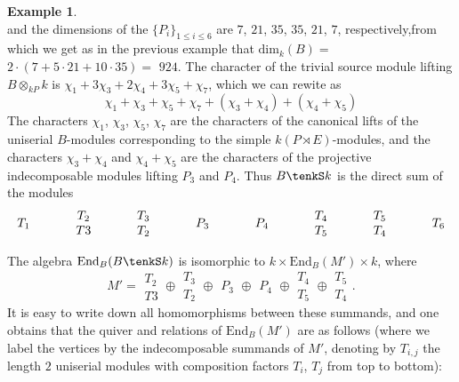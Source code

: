 \documentclass{amsart}
\theoremstyle{plain}\newtheorem{Theorem}{Theorem}[section]
\theoremstyle{plain}\newtheorem{Conjecture}[Theorem]{Conjecture}
\theoremstyle{plain}\newtheorem{Corollary}[Theorem]{Corollary}
\theoremstyle{plain}\newtheorem{Lemma}[Theorem]{Lemma}
\theoremstyle{plain}\newtheorem{Proposition}[Theorem]{Proposition}
\theoremstyle{definition}\newtheorem{Definition}[Theorem]{Definition}
\theoremstyle{definition}\newtheorem{Example}[Theorem]{Example}
\theoremstyle{definition}\newtheorem{Examples}[Theorem]{Examples}
\theoremstyle{definition}\newtheorem{Exercise}[Theorem]{Exercise}
\theoremstyle{definition}\newtheorem{Notation}[Theorem]{Notation}
\theoremstyle{definition}\newtheorem{Remark}[Theorem]{Remark}
\theoremstyle{definition}\newtheorem{Remarks}[Theorem]{Remarks}
\theoremstyle{plain}\newtheorem{Statement}[Theorem]{}
\def\dim{\mathrm{dim}}   \def\tenkP{\otimes_{kP}} \def\tenkQ{\otimes_{kQ}}
\def\End{\mathrm{End}}
\begin{document}
\begin{Example}
$$$$
and the dimensions of the $\{P_i\}_{1\leq i\leq 6}$ are $7$, $21$, $35$, $35$, $21$, $7$,
respectively,from which we get as in the previous example  that 
$\dim_k(B)=$ $2\cdot(7+5\cdot 21 + 10\cdot 35)=$ $924$.
The character of the trivial source module lifting $B\tenkP k$ is
$\chi_1+3\chi_3+2\chi_4+3\chi_5+\chi_7$, %
which we can rewite as 
$$\chi_1 + \chi_3 + \chi_5 + \chi_7 + (\chi_3+\chi_4) + (\chi_4+\chi_5)$$
The characters  $\chi_1$, $\chi_3$, $\chi_5$, $\chi_7$ are the characters of
the canonical lifts of the uniserial $B$-modules corresponding to the simple 
$k(P\rtimes E)$-modules, and the characters $\chi_3+\chi_4$ and $\chi_4+\chi_5$
are the characters of the projective indecomposable modules lifting $P_3$ and $P_4$.
Thus $B\tenkS k$ is the direct sum of the modules
$$\begin{matrix} T_1\end{matrix} \hskip13mm
\begin{matrix} T_2\\T3\end{matrix} \hskip13mm
\begin{matrix} T_3\\T_2\end{matrix} \hskip13mm
\begin{matrix} P_3\end{matrix} \hskip13mm
\begin{matrix} P_4\end{matrix} \hskip13mm
\begin{matrix} T_4\\T_5\end{matrix} \hskip13mm
\begin{matrix} T_5\\T_4\end{matrix} \hskip13mm
\begin{matrix} T_6\end{matrix} $$

The algebra $\End_{B}(B\tenkS k)$  is isomorphic to $k \times \End_{B}(M') \times k$, 
where
$$M'=
\begin{matrix} T_2\\T3\end{matrix} \oplus
\begin{matrix} T_3\\T_2\end{matrix} \oplus
\begin{matrix} P_3\end{matrix} \oplus
\begin{matrix} P_4\end{matrix} \oplus
\begin{matrix} T_4\\T_5\end{matrix} \oplus
\begin{matrix} T_5\\T_4\end{matrix} .$$
It is easy to write down all homomorphisms between these summands, and one 
obtains that the quiver and relations of $\End_{B}(M')$ are as follows (where we
label the vertices by the indecomposable summands of $M'$, denoting by $T_{i,j}$ the
length $2$ uniserial modules with composition factors $T_i$, $T_j$ from top to 
bottom):


\end{Example}
\end{document}
